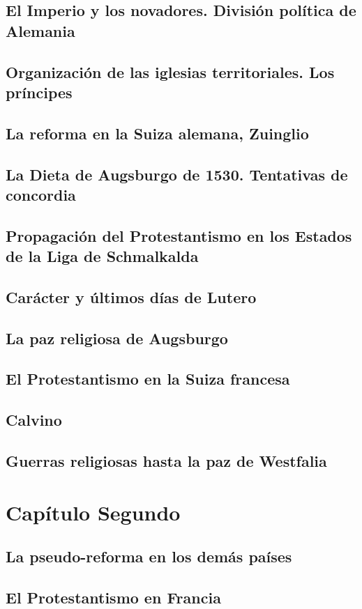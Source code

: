 \raggedbottom{} \documentclass[12pt, a4paper, openany]{book} %
\begin{document}
\section{El Imperio y los novadores. División política de Alemania}
\section{Organización de las iglesias territoriales. Los príncipes}
\section{La reforma en la Suiza alemana, Zuinglio}
\section{La Dieta de Augsburgo de 1530. Tentativas de concordia}
\section{Propagación del Protestantismo en los Estados de la Liga de Schmalkalda}
\section{Carácter y últimos días de Lutero}
\section{La paz religiosa de Augsburgo}
\section{El Protestantismo en la Suiza francesa}
\section{Calvino}
\section{Guerras religiosas hasta la paz de Westfalia}
\chapter{Capítulo Segundo}
\section{La pseudo-reforma en los demás países}
\section{El Protestantismo en Francia}
\end{document}
